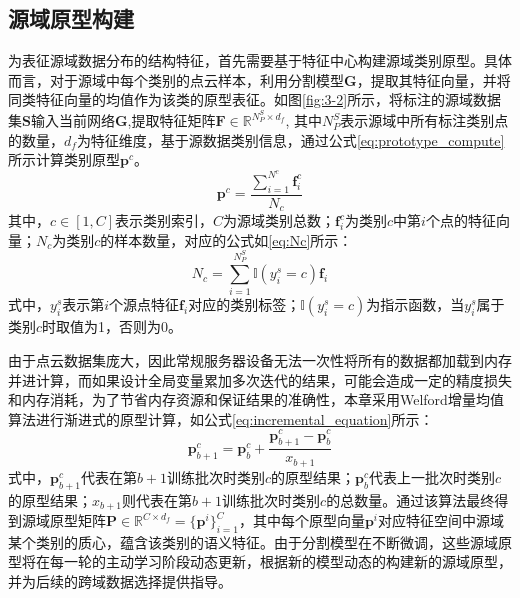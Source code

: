 \subsection{源域原型构建}
为表征源域数据分布的结构特征，首先需要基于特征中心构建源域类别原型。具体而言，对于源域中每个类别的点云样本，利用分割模型$\mathbf{G}$，提取其特征向量，并将同类特征向量的均值作为该类的原型表征。如图\ref{fig:3-2}所示，将标注的源域数据集$\mathbf{S}$输入当前网络$\mathbf{G}$,提取特征矩阵$\mathbf{F} \in \mathbb{R}^{{N^S_P} \times d_f}$, 其中\(N^S_P\)表示源域中所有标注类别点的数量，$d_f$为特征维度，基于源数据类别信息，通过公式\eqref{eq:prototype_compute}所示计算类别原型\( \mathbf{p}^c \)。
\begin{equation}
    \label{eq:prototype_compute}
    \mathbf{p}^c = \frac{\sum_{i=1}^{N^c} \mathbf{f}_i^c}{N_c}
\end{equation}
其中，\( c \in [1, C] \)表示类别索引，\( C \)为源域类别总数；\( \mathbf{f}_i^c \)为类别\( c \)中第\( i \)个点的特征向量；\( N_c \)为类别\( c \)的样本数量，对应的公式如\eqref{eq:Nc}所示：
\begin{equation}
    \label{eq:Nc}
    N_c = \sum^{N^S_P}_{i=1} \mathbb{I}(y^s_i = c)\mathbf{f}_i
\end{equation}
式中，\( y^s_i \)表示第\(i\)个源点特征\( \mathbf{f}_i \)对应的类别标签；$\mathbb{I}(y^s_i = c)$为指示函数，当$y^s_i$属于类别$c$时取值为1，否则为0。

由于点云数据集庞大，因此常规服务器设备无法一次性将所有的数据都加载到内存并进计算，而如果设计全局变量累加多次迭代的结果，可能会造成一定的精度损失和内存消耗，为了节省内存资源和保证结果的准确性，本章采用Welford增量均值算法进行渐进式的原型计算，如公式\eqref{eq:incremental_equation}所示：
\begin{equation}
\label{eq:incremental_equation}
    \mathbf{p}_{b+1}^c = \mathbf{p}_b^c + \frac{\mathbf{p}_{b+1}^c - \mathbf{p}_b^c}{x_{b+1}}
\end{equation}
式中，\(\mathbf{p}_{b+1}^c\)代表在第\(b+1\)训练批次时类别\(c\)的原型结果；\(\mathbf{p}_{b}^c\)代表上一批次时类别\(c\)的原型结果；\( x_{b+1} \)则代表在第\( b+1 \)训练批次时类别\( c \)的总数量。通过该算法最终得到源域原型矩阵\( \mathbf{P} \in \mathbb{R}^{C \times {d_f}} = \{\mathbf{p}^i\}^C_{i=1} \)，其中每个原型向量\(\mathbf{p}^i\)对应特征空间中源域某个类别的质心，蕴含该类别的语义特征。由于分割模型在不断微调，这些源域原型将在每一轮的主动学习阶段动态更新，根据新的模型动态的构建新的源域原型，并为后续的跨域数据选择提供指导。

